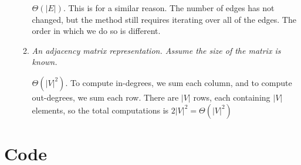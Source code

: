\documentclass[12pt]{article}
\begin{document}
\begin{enumerate}
\begin{enumerate}
         $\Theta(|E|)$. This is for a similar reason. The number of edges has not changed, but the method still requires iterating over all of the edges. The order in which we do so is different.\\
         
         \item \textit{An adjacency matrix representation. Assume the size of the matrix is known.}
         
         $\Theta(|V|^2)$. To compute in-degrees, we sum each column, and to compute out-degrees, we sum each row. There are $|V|$ rows, each containing $|V|$ elements, so the total computations is $2|V|^2 = \Theta(|V|^2)$
         
    \end{enumerate}

\end{enumerate}

\newpage
\appendix
\section{Code}
\label{sec:code}
\end{document}
